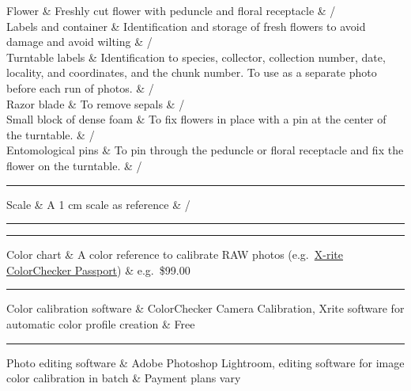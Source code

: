 \documentclass[
]{book}
\theoremstyle{definition}
\theoremstyle{definition}
\theoremstyle{definition}
\theoremstyle{definition}
\theoremstyle{remark}
\begin{document}
\hfill\break
Flower \& Freshly cut flower with peduncle and floral receptacle \& /\\
Labels and container \& Identification and storage of fresh flowers to
avoid damage and avoid wilting \& /\\
Turntable labels \& Identification to species, collector, collection
number, date, locality, and coordinates, and the chunk number. To use as
a separate photo before each run of photos. \& /\\
Razor blade \& To remove sepals \& /\\
Small block of dense foam \& To fix flowers in place with a pin at the
center of the turntable. \& /\\
Entomological pins \& To pin through the peduncle or floral receptacle
and fix the flower on the turntable. \& /\\

\begin{center}\rule{0.5\linewidth}{0.5pt}\end{center}

Scale \& A 1 cm scale as reference \& /\\

\begin{center}\rule{0.5\linewidth}{0.5pt}\end{center}

\hfill\break

\begin{center}\rule{0.5\linewidth}{0.5pt}\end{center}

Color chart \& A color reference to calibrate RAW photos (e.g.~\href{https://www.xrite.com/categories/calibration-profiling/colorchecker-targets/colorchecker-passport-photo-2}{X-rite
ColorChecker
Passport})
\& e.g.~\$99.00\\

\begin{center}\rule{0.5\linewidth}{0.5pt}\end{center}

Color calibration software \& ColorChecker Camera Calibration, Xrite
software for automatic color profile creation \& Free\\

\begin{center}\rule{0.5\linewidth}{0.5pt}\end{center}

Photo editing software \& Adobe Photoshop Lightroom, editing software for
image color calibration in batch \& Payment plans vary\\
\end{document}
